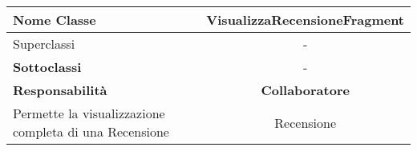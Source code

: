 
\setcounter{table}{0}
\begin{table}[H]
    \centering
    \begin{tabularx}{\textwidth}{||   X  ||  c   ||}
        \hline
        \rowcolor{Gray}
        \textbf{Nome Classe} & VisualizzaRecensioneFragment\\
        \hline
        Superclassi  &  - \\
        \hline
        \textbf{Sottoclassi} & - \\
        \hline
         \textbf{Responsabilità} & \textbf{Collaboratore} \\
         \hline
          Permette la visualizzazione completa di una Recensione  & Recensione \\
         \hline
    \end{tabularx}
\end{table}
